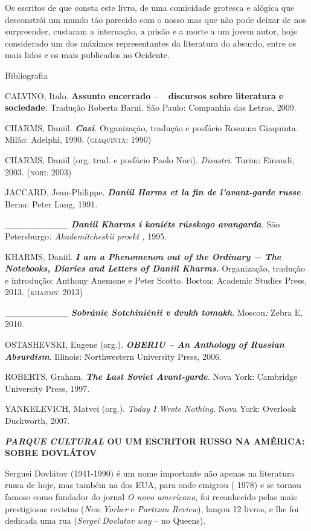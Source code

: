 Os escritos de que consta este livro, de uma comicidade grotesca e
alógica que desconstrói um mundo tão parecido com o nosso mas que não
pode deixar de nos surpreender, custaram a internação, a prisão e a
morte a um jovem autor, hoje considerado um dos máximos representantes
da literatura do absurdo, entre os mais lidos e os mais publicados no
Ocidente.

Bibliografia

CALVINO, Italo. \textbf{Assunto encerrado --~~discursos sobre literatura
e sociedade}. Tradução Roberta Barni. São Paulo: Companhia das Letras,
2009.

CHARMS, Daniil. \emph{\textbf{Casi}.} Organização, tradução e posfácio
Rosanna Giaquinta. Milão: Adelphi, 1990. (\textsc{giaquinta}: 1990)

CHARMS, Daniil (org. trad. e posfácio Paolo Nori). \emph{Disastri.}
Turim: Einaudi, 2003. (\textsc{nori}: 2003)

JACCARD, Jean-Philippe. \emph{\textbf{Daniil Harms et la fin de
l'avant-garde russe}.} Berna: Peter Lang, 1991.~

\_\_\_\_\_\_\_\_\_\_ \emph{\textbf{Daniil Kharms i koniéts rússkogo
avangarda}.} São Petersburgo\emph{: Akademítcheskii proekt ,} 1995.

KHARMS, Daniil. \emph{\textbf{I am a Phenomenon out of the Ordinary −
The Notebooks, Diaries and Letters of Daniil Kharms.}} Organização,
tradução e introdução: Anthony Anemone e Peter Scotto. Boston: Academic
Studies Press, 2013. (\textsc{kharms}: 2013)

\_\_\_\_\_\_\_\_\_\_ \emph{\textbf{Sobránie Sotchiniénii v dvukh
tomakh}}. Moscou\emph{:} Zebra E, 2010.

OSTASHEVSKI, Eugene (org.). \emph{\textbf{OBERIU -- An Anthology of
Russian Absurdism}}. Illinois: Northwestern University Press, 2006.

ROBERTS, Graham. \emph{\textbf{The Last Soviet Avant-garde}.} Nova York:
Cambridge University Press, 1997.

YANKELEVICH, Matvei (org.). \emph{Today I Wrote Nothing.} Nova York:
Overlook Duckworth, 2007.

\textbf{\emph{PARQUE CULTURAL} OU UM ESCRITOR RUSSO NA AMÉRICA: SOBRE
DOVLÁTOV}

Serguei Dovlátov (1941-1990) é um nome importante não apenas na
literatura russa de hoje, mas também na dos EUA, para onde emigrou (
1978) e se tornou famoso como fundador do jornal \emph{O novo
americano}, foi reconhecido pelas mais prestigiosas revistas (\emph{New
Yorker} e \emph{Partizan Review}), lançou 12 livros, e lhe foi dedicada
uma rua (\emph{Sergei} \emph{Dovlatov way} -- no Queens).

